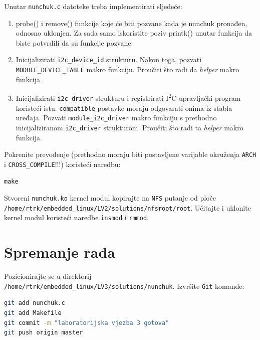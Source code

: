 \documentclass[11pt]{article}
\begin{document}
Unutar \texttt{nunchuk.c} datoteke treba implementirati sljedeće:
\begin{enumerate}
	\item probe() i remove() funkcije koje će biti pozvane kada je nunchuk
pronađen, odnosno uklonjen. Za sada samo iskoristite poziv printk() unutar
funkcija da biste potvrdili da su funkcije pozvane.
	\item Inicijalizirati \texttt{i2c\_device\_id} strukturu. Nakon toga,
		pozvati \texttt{MODULE\_DEVICE\_TABLE} makro funkciju. Proučiti
		što radi da \textit{helper} makro funkcija.
	\item Inicijalizirati \texttt{i2c\_driver} strukturu i registrirati
		I\textsuperscript{2}C upravljački program koristeći istu.
		\texttt{compatible} postavke moraju odgovarati onima iz stabla
		uređaja. Pozvati \texttt{module\_i2c\_driver} makro funkciju s
		prethodno inicijaliziranom \texttt{i2c\_driver} strukturom.
		Proučiti što radi ta \textit{helper} makro funkcija.
\end{enumerate}

Pokrenite prevođenje (prethodno moraju biti postavljene varijable okruženja
\texttt{ARCH} i \texttt{CROSS\_COMPILE}!!!) koristeći naredbu:
\begin{lstlisting}
make
\end{lstlisting}

\noindent Stvoreni \texttt{nunchuk.ko} kernel modul kopirajte na \texttt{NFS} putanje
od ploče \texttt{/home/rtrk/embedded\_linux/LV2/solutions/nfsroot/root}.
Učitajte i uklonite kernel modul koristeći naredbe \texttt{insmod} i \texttt{rmmod}.

\section{Spremanje rada}
Pozicionirajte se u direktorij \texttt{/home/rtrk/embedded\_linux/LV3/solutions/nunchuk}.
Izvršite \texttt{Git} komande:
\begin{lstlisting}[language=bash]
git add nunchuk.c
git add Makefile
git commit -m "laboratorijska vjezba 3 gotova"
git push origin master
\end{lstlisting}
\end{document}
